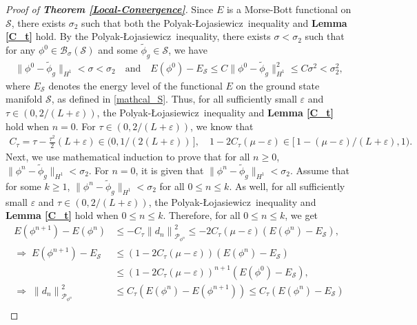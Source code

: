 \documentclass[preprint,3p]{elsarticle}
\begin{document}
\begin{proof}[Proof of {\bf Theorem \ref{Local-Convergence}}] Since $E$ is a Morse-Bott functional on $\mathcal{S}$, there exists $\sigma_2$ such that both the Polyak-\L ojasiewicz\ inequality and {\bf Lemma \ref{C_t}} hold. 
	 By the Polyak-\L ojasiewicz\ inequality, there exists $\sigma<\sigma_2$ such that for any $\phi^0\in\mathcal{B}_{\sigma}(\mathcal{S})$ and some $\widetilde{\phi}_g\in\mathcal{S}$, we have
	\begin{align*}
		\|\phi^0-\widetilde{\phi}_g\|_{H^1}<\sigma<\sigma_2\quad\text{and}\quad E(\phi^0)-E_{\mathcal{S}}\le C\|\phi^0-\widetilde{\phi}_g\|^2_{H^1}\le C\sigma^2<\sigma^2_2,
	\end{align*}
{where $E_{\mathcal{S}}$ denotes the energy level of the functional $E$ on the ground state manifold $\mathcal{S}$, as defined in \eqref{mathcal_S}.}
	Thus, for all sufficiently small $\varepsilon$ and $\tau\in(0,2/(L+\varepsilon))$, the Polyak-\L ojasiewicz\ inequality and {\bf Lemma \ref{C_t}} hold when $n=0$. 
	For $\tau\in(0,2/(L+\varepsilon))$, we know that
	\begin{align*}
		C_{\tau}=\tau-\frac{\tau^2}{2}(L+\varepsilon)\in(0,1/(2(L+\varepsilon))\,],\quad1-2C_{\tau}(\mu-\varepsilon)\in\big[\,1-(\mu-\varepsilon)/(L+\varepsilon),1\big).
	\end{align*} 
	Next, we use mathematical induction to prove that for all $ n \ge 0 $, $\|\phi^n-\widetilde{\phi}_g\|_{H^1}<\sigma_2$. For $ n = 0 $, it is given that $\|\phi^n-\widetilde{\phi}_g\|_{H^1}<\sigma_2$. Assume that for some $ k \ge 1 $, $\|\phi^n-\widetilde{\phi}_g\|_{H^1}<\sigma_2$ for all $0\le n\le k$. As well, for all sufficiently small $\varepsilon$ and $\tau\in(0,2/(L+\varepsilon))$, the Polyak-\L ojasiewicz\ inequality and {\bf Lemma \ref{C_t}} hold when $0\le n\le k$. Therefore, for all $0\le n\le k$, we get 
	\begin{align*}
		E(\phi^{n+1})-E(\phi^{n})&\le-C_{\tau}\left\|d_n\right\|^2_{\mathcal{P}_{\phi^n}}\le-2C_{\tau}(\mu-\varepsilon)\left(E(\phi^{n})-E_{\mathcal{S}}\right),\\
		\Longrightarrow\; E(\phi^{n+1})-E_{\mathcal{S}}&\le\left(1-2C_{\tau}(\mu-\varepsilon)\right)\left(E(\phi^{n})-E_{\mathcal{S}}\right)\\
		&\le\left(1-2C_{\tau}(\mu-\varepsilon)\right)^{n+1}\left(E(\phi^{0})-E_{\mathcal{S}}\right),\\
		\Longrightarrow\; \left\|d_n\right\|^2_{\mathcal{P}_{\phi^n}}&\le C_{\tau}(E(\phi^{n})-E(\phi^{n+1}))\le C_{\tau}(E(\phi^{n})-E_{\mathcal{S}})\\

\end{align*}
\end{proof}
\end{document}
